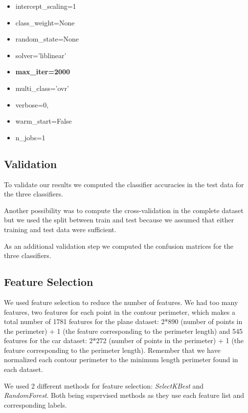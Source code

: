 \documentclass{article} %
\begin{document}
\begin{enumerate}
\begin{multicols}{2}
\begin{itemize}
        \item intercept\_scaling=1
        \item class\_weight=None
        \item random\_state=None
        \item solver=’liblinear’
        \item \textbf{max\_iter=2000}
        \item multi\_class=’ovr’
        \item verbose=0, 
        \item warm\_start=False 
        \item n\_jobs=1
    \end{itemize}
    \end{multicols}
\end{enumerate}
 
\subsection{Validation}
 
To validate our results we computed the classifier accuracies in the test data for the three classifiers.

Another possibility was to compute the cross-validation in the complete dataset but we used the split between train and test because we assumed that either training and test data were sufficient. 

As an additional validation step we computed the confusion matrices for the three classifiers.
 
\subsection{Feature Selection}

We used feature selection to reduce the number of features. We had too many features, two features for each point in the contour perimeter, which makes a total number of 1781 features for the plane dataset: 2*890 (number of points in the perimeter) + 1 (the feature corresponding to the perimeter length) and 545 features for the car dataset: 2*272 (number of points in the perimeter) + 1 (the feature corresponding to the perimeter length). Remember that we have normalized each contour perimeter to the minimum length perimeter found in each dataset.

We used 2 different methods for feature selection: \textit{SelectKBest} and \textit{RandomForest}. Both being supervised methods as they use each feature list and corresponding labels. 
\end{document}
